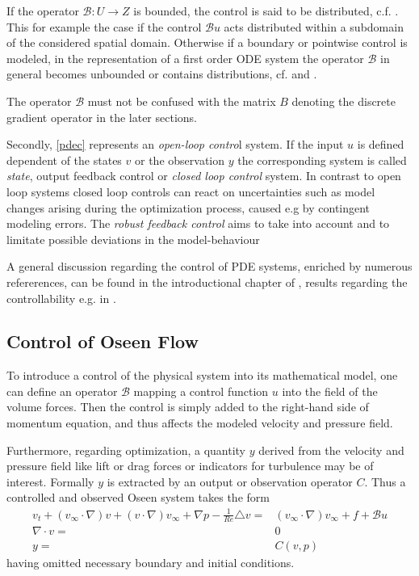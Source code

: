 \documentclass[a4paper,10pt,BCOR=15mm]{scrbook}
\begin{document}
If the operator $\mathcal B:U\rightarrow Z$ is bounded, the control is said to be distributed, c.f. \cite{bens1,bens2,lionscont,schm}. This for example the case if the control $\mathcal Bu$ acts distributed within a subdomain of the considered spatial domain. Otherwise if a boundary or pointwise control is modeled, in the representation of a first order ODE system the operator $\mathcal B$ in general becomes unbounded or contains distributions, cf. \cite[p.~39]{schm} and \cite[p.~7]{bens1}.

\begin{rem}
 The operator $\mathcal B$ must not be confused with the matrix $B$ denoting the discrete gradient operator in the later sections.
\end{rem}


Secondly, \eqref{pdec} represents an \textit{open-loop contro}l system. If the input $u$ is defined dependent of the states $v$ or the observation $y$ the corresponding system is called \textit{state}, {output feedback control} or \textit{closed loop control} system. In contrast to open loop systems closed loop controls can react on uncertainties such as model changes arising during the optimization process, caused e.g  by contingent modeling errors. The \textit{robust feedback control} aims to take into account and to limitate possible deviations in the model-behaviour \cite{chri,gupo,skog}

A general discussion regarding the control of PDE systems, enriched by numerous refererences, can be found in the introductional chapter of \cite{chri}, results regarding the controllability e.g. in \cite{mizu}.


\subsection{Control of Oseen Flow}
To introduce a control of the physical system into its mathematical model, one can define an operator $\mathcal B$ mapping a control function $u$ into the field of the volume forces. Then the control is simply added to the right-hand side of momentum equation, and thus affects the modeled velocity and pressure field. 

Furthermore, regarding optimization, a quantity $y$ derived from the velocity and pressure field like lift or drag forces or indicators for turbulence may be of interest. Formally $y$ is extracted by an output or observation operator $C$. Thus a controlled and observed Oseen system takes the form
\begin{subequations}\label{osec}
\begin{align}
 v_t +  (v_\infty \cdot \nabla) v+(v \cdot \nabla) v_\infty+\nabla p - \frac{1}{Re} \triangle v =&  (v_\infty \cdot \nabla) v_\infty + f  + \mathcal Bu\\
\nabla \cdot v =& 0 \label{oseccont} \\
 y=&C(v,p)
\end{align}
\end{subequations}
having omitted necessary boundary and initial conditions.
\end{document}
